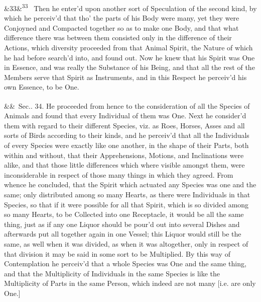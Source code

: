 \documentclass[12pt]{article}
\newcommand{\para}[1][]{\par\noindent\ifx&#1&\else\textsuperscript{\footnotesize #1}~\fi}
\begin{document}
\para[33] Then he enter'd upon another sort of Speculation of the second kind, by which he perceiv'd that tho' the parts of his Body were many, yet they were Conjoyned and Compacted together so as to make one Body, and that what difference there was between them consisted only in the difference of their Actions, which diversity proceeded from that Animal Spirit, the Nature of which he had before search'd into, and found out. Now he knew that his Spirit was One in Essence, and was really the Substance of his Being, and that all the rest of the Members serve that Spirit as Instruments, and in this Respect he perceiv'd his own Essence, to be One.

\para Sec.. 34. He proceeded from hence to the consideration of all the Species of Animals and found that every Individual of them was One. Next he consider'd them with regard to their different Species, viz. as Roes, Horses, Asses and all sorts of Birds according to their kinds, and he perceiv'd that all the Individuals of every Species were exactly like one another, in the shape of their Parts, both within and without, that their Apprehensions, Motions, and Inclinations were alike, and that those little differences which where visible amongst them, were inconsiderable in respect of those many things in which they agreed. From whence he concluded, that the Spirit which actuated any Species was one and the same; only distributed among so many Hearts, as there were Individuals in that Species, so that if it were possible for all that Spirit, which is so divided among so many Hearts, to be Collected into one Receptacle, it would be all the same thing, just as if any one Liquor should be pour'd out into several Dishes and afterwards put all together again in one Vessel; this Liquor would still be the same, as well when it was divided, as when it was altogether, only in respect of that division it may be said in some sort to be Multiplied. By this way of Contemplation he perceiv'd that a whole Species was One and the same thing, and that the Multiplicity of Individuals in the same Species is like the Multiplicity of Parts in the same Person, which indeed are not many [i.e. are only One.]
\end{document}
